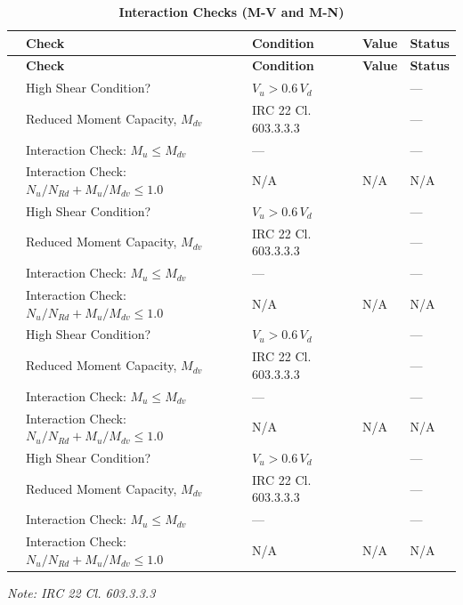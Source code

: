 \documentclass[12pt,a4paper]{report}
\numberwithin{table}{chapter}
\numberwithin{figure}{chapter}
\begin{document}
\vspace{1em}
\begin{longtable}{|C{2.5cm}|C{3.5cm}|C{3.5cm}|>{\centering\arraybackslash}p{4.2cm}|C{1.8cm}|}
\caption{\textbf{Interaction Checks (M-V and M-N)}}
\hline
{} \textbf{} & \textbf{Check} & \textbf{Condition} & \textbf{Value} & \textbf{Status} \\[6pt]
\hline
\endfirsthead
\hline
{} \textbf{} & \textbf{Check} & \textbf{Condition} & \textbf{Value} & \textbf{Status} \\[6pt]
\hline
\endhead
{} & High Shear Condition? & $V_u > 0.6\,V_d$ &  & --- \\[6pt]
 & Reduced Moment Capacity, $M_{dv}$ & IRC 22 Cl. 603.3.3.3 &  & --- \\[6pt]
 & Interaction Check: $M_u \leq M_{dv}$ & --- &  & --- \\[6pt]
 & Interaction Check: $N_u/N_{Rd} + M_u/M_{dv} \leq 1.0$ & N/A & N/A & N/A \\[6pt]
\hline
{} & High Shear Condition? & $V_u > 0.6\,V_d$ &  & --- \\[6pt]
 & Reduced Moment Capacity, $M_{dv}$ & IRC 22 Cl. 603.3.3.3 &  & --- \\[6pt]
 & Interaction Check: $M_u \leq M_{dv}$ & --- &  & --- \\[6pt]
 & Interaction Check: $N_u/N_{Rd} + M_u/M_{dv} \leq 1.0$ & N/A & N/A & N/A \\[6pt]
\hline
{} & High Shear Condition? & $V_u > 0.6\,V_d$ &  & --- \\[6pt]
 & Reduced Moment Capacity, $M_{dv}$ & IRC 22 Cl. 603.3.3.3 &  & --- \\[6pt]
 & Interaction Check: $M_u \leq M_{dv}$ & --- &  & --- \\[6pt]
 & Interaction Check: $N_u/N_{Rd} + M_u/M_{dv} \leq 1.0$ & N/A & N/A & N/A \\[6pt]
\hline
{} & High Shear Condition? & $V_u > 0.6\,V_d$ &  & --- \\[6pt]
 & Reduced Moment Capacity, $M_{dv}$ & IRC 22 Cl. 603.3.3.3 &  & --- \\[6pt]
 & Interaction Check: $M_u \leq M_{dv}$ & --- &  & --- \\[6pt]
 & Interaction Check: $N_u/N_{Rd} + M_u/M_{dv} \leq 1.0$ & N/A & N/A & N/A \\[6pt]
\hline
\end{longtable}
\noindent\textit{Note: IRC 22 Cl. 603.3.3.3}
\end{document}
